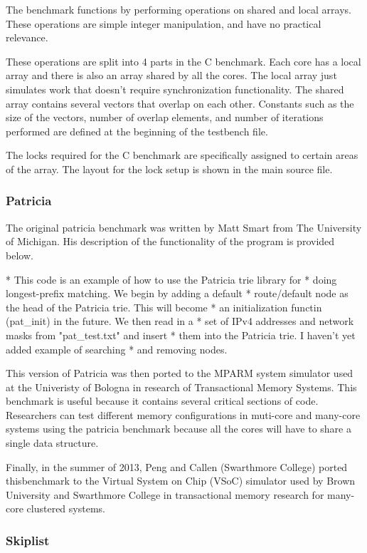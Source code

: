 \documentclass{article}
\begin{document}
The benchmark functions by performing operations on shared and local arrays. 
These operations are simple integer manipulation, and have no practical 
relevance. 

These operations are split into 4 parts in the C benchmark. Each core has a 
local array and there is also an array shared by all the cores. The local 
array just simulates work that doesn't require synchronization functionality. 
The shared array contains several vectors that overlap on each other. 
Constants such as the size of the vectors, number of overlap elements, and 
number of iterations performed are defined at the beginning of the testbench
 file. 

The locks required for the C benchmark are specifically assigned to certain 
areas of the array. The layout for the lock setup is shown in the main source 
file.

\subsubsection{Patricia}

The original patricia benchmark was written by Matt Smart from The University of
 Michigan. His description of the functionality of the program is provided
below. 

 * This code is an example of how to use the Patricia trie library for
 * doing longest-prefix matching.  We begin by adding a default
 * route/default node as the head of the Patricia trie.  This will become
 * an initialization functin (pat\_init) in the future.  We then read in a
 * set of IPv4 addresses and network masks from "pat\_test.txt" and insert
 * them into the Patricia trie.  I haven't yet added example of searching
 * and removing nodes.

This version of Patricia was then ported to the MPARM system simulator used at 
the Univeristy of Bologna in research of Transactional Memory Systems. This
benchmark is useful because it contains several critical sections of code. 
Researchers can test different memory configurations in muti-core and many-core 
systems using the patricia benchmark because all the cores will have to share a 
single data structure. 

Finally, in the summer of 2013, Peng and Callen (Swarthmore College) ported 
thisbenchmark to the Virtual System on Chip (VSoC) simulator used by Brown 
University and Swarthmore College in transactional memory research for 
many-core clustered systems. 

\subsubsection{Skiplist}
\end{document}
